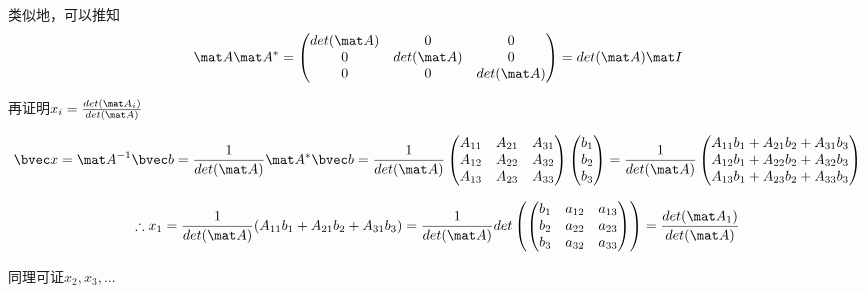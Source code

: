 类似地，可以推知
\begin{equation}
\mat A \mat A^* =
\begin{pmatrix}
det(\mat A)&0&0\\
0&det(\mat A)&0\\
0&0&det(\mat A)\\
\end{pmatrix}
=det(\mat A) \mat I
\end{equation}

再证明$x_i=\frac{det(\mat A_i)}{det(\mat A)}$

$$
\bvec x = \mat A^{-1} \bvec b = \frac{1}{det(\mat A)}\mat A^* \bvec b = 
\frac{1}{det(\mat A)}
\begin{pmatrix}
A_{11}&A_{21}&A_{31}\\
A_{12}&A_{22}&A_{32}\\
A_{13}&A_{23}&A_{33}\\
\end{pmatrix}
\begin{pmatrix}
b_1\\
b_2\\
b_3\\
\end{pmatrix}
=
\frac{1}{det(\mat A)}
\begin{pmatrix}
A_{11}b_1+A_{21}b_2+A_{31}b_3\\
A_{12}b_1+A_{22}b_2+A_{32}b_3\\
A_{13}b_1+A_{23}b_2+A_{33}b_3\\
\end{pmatrix}
$$

$$
\therefore x_1=\frac{1}{det(\mat A)}(A_{11}b_1+A_{21}b_2+A_{31}b_3)
=\frac{1}{det(\mat A)}det\left(
\begin{pmatrix}
b_{1}&a_{12}&a_{13}\\
b_{2}&a_{22}&a_{23}\\
b_{3}&a_{32}&a_{33}\\
\end{pmatrix}
\right)
=\frac{det(\mat A_1)}{det(\mat A)}
$$

同理可证$x_2, x_3,...$
